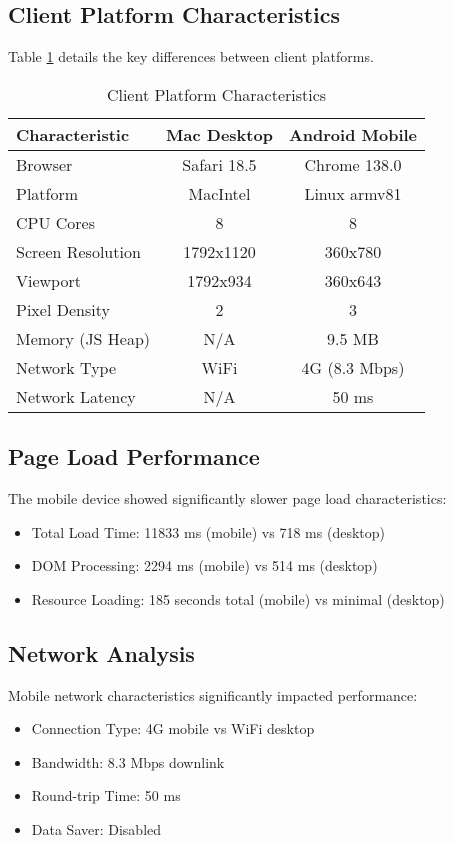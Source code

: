 \documentclass[conference]{IEEEtran}
\begin{document}
\subsection{Client Platform Characteristics}

Table \ref{tab:client-characteristics} details the key differences between client platforms.

\begin{table}[htbp]
\centering
\caption{Client Platform Characteristics}
\label{tab:client-characteristics}
\begin{tabular}{@{}lcc@{}}
\toprule
Characteristic & Mac Desktop & Android Mobile \\
\midrule
Browser & Safari 18.5 & Chrome 138.0 \\
Platform & MacIntel & Linux armv81 \\
CPU Cores & 8 & 8 \\
Screen Resolution & 1792x1120 & 360x780 \\
Viewport & 1792x934 & 360x643 \\
Pixel Density & 2 & 3 \\
Memory (JS Heap) & N/A & 9.5 MB \\
Network Type & WiFi & 4G (8.3 Mbps) \\
Network Latency & N/A & 50 ms \\
\bottomrule
\end{tabular}
\end{table}

\subsection{Page Load Performance}

The mobile device showed significantly slower page load characteristics:
\begin{itemize}
    \item Total Load Time: 11833 ms (mobile) vs 718 ms (desktop)
    \item DOM Processing: 2294 ms (mobile) vs 514 ms (desktop)
    \item Resource Loading: 185 seconds total (mobile) vs minimal (desktop)
\end{itemize}

\subsection{Network Analysis}

Mobile network characteristics significantly impacted performance:
\begin{itemize}
    \item Connection Type: 4G mobile vs WiFi desktop
    \item Bandwidth: 8.3 Mbps downlink
    \item Round-trip Time: 50 ms
    \item Data Saver: Disabled
\end{itemize}
\end{document}
